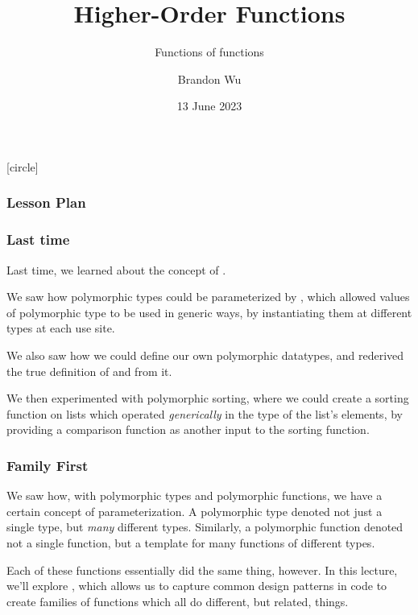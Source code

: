 \documentclass[aspectratio=169, handout]{beamer}
\title{Higher-Order Functions} %
\subtitle{Functions of functions} %
\date{13 June 2023} %
\author{Brandon Wu} %
\newif\ifcolorlambda
\begin{document}
\ifweb
    \renewcommand{\pause}{}
\fi

[circle]

{
\begin{frame}[plain]
    \colorlambdatrue
    \titlepage
\end{frame}
}


\begin{frame}[fragile]
  \frametitle{Lesson Plan}

  \tableofcontents
\end{frame}

\begin{frame}[fragile]
  \frametitle{Last time}

  Last time, we learned about the concept of .

  \pause
  \vspace{\fill}

  We saw how polymorphic types could be parameterized by , which
  allowed values of polymorphic type to be used in generic ways, by instantiating them
  at different types at each use site.

  \pause
  \vspace{\fill}

  We also saw how we could define our own polymorphic datatypes, and rederived the true
  definition of  and  from it.

  \pause
  \vspace{\fill}

  We then experimented with polymorphic sorting, where we could create a sorting function
  on lists which operated \textit{generically} in the type of the list's elements, by providing
  a comparison function as another input to the sorting function. 
\end{frame}


\begin{frame}[fragile]
  \frametitle{Family First}

  We saw how, with polymorphic types and polymorphic functions, we have a certain concept
  of parameterization. A polymorphic type denoted not just a single type, but 
  \textit{many} different types. Similarly, a polymorphic function denoted not a single
  function, but a template for many functions of different types. 

  \pause
  \vspace{\fill}

  Each of these functions essentially did the same thing, however\footnotemark. In this
  lecture, we'll explore , which allows us to capture 
  common design patterns in code to create families of functions which all do different,
  but related, things. 

\end{frame}
\end{document}

